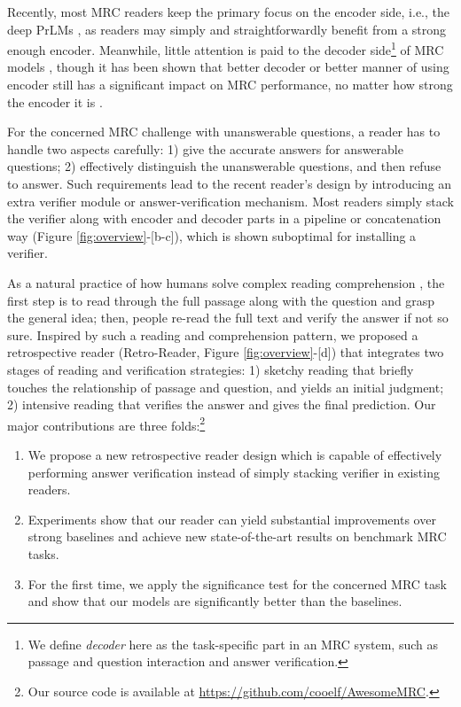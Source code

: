 \documentclass[letterpaper]{article} %
\begin{document}
Recently, most MRC readers keep the primary focus on the encoder side, i.e., the deep PrLMs \cite{devlin2018bert,yang2019xlnet,Lan2020ALBERT}, as readers may simply and straightforwardly benefit from a strong enough encoder. Meanwhile, little attention is paid to the decoder side\footnote{We define \textit{decoder} here as the task-specific part in an MRC system, such as passage and question interaction and answer verification.} of MRC models %
\cite{hu2019read,back2020neurquri,reddy2020answer}, though it has been shown that better decoder or better manner of using encoder still has a significant impact on MRC performance, no matter how strong the encoder it is \cite{dcmn20,liu2021filling,li2019dependency,li2018unified,zhu2020dual}.


For the concerned MRC challenge with unanswerable questions, a reader has to handle two aspects carefully: 1) give the accurate answers for answerable questions; 2) effectively distinguish the unanswerable questions, and then refuse to answer. Such requirements lead to the recent reader's design by introducing an extra verifier module or answer-verification mechanism. Most readers simply stack the verifier along with encoder and decoder parts in a pipeline or concatenation way (Figure \ref{fig:overview}-[b-c]), which is shown suboptimal for installing a verifier.

As a natural practice of how humans solve complex reading comprehension \cite{DBLP:conf/sigir/ZhengMLYZM19,doi:10.1080/00461520.1987.9653053}, the first step is to read through the full passage along with the question and grasp the general idea; then, people re-read the full text and verify the answer if not so sure. Inspired by such a reading and comprehension pattern, we proposed a retrospective reader (Retro-Reader, Figure \ref{fig:overview}-[d]) that integrates two stages of reading and verification strategies: 1) sketchy reading that briefly touches the relationship of passage and question, and yields an initial judgment; 2) intensive reading that verifies the answer and gives the final prediction. Our major contributions are three folds:\footnote{Our source code is available at \url{https://github.com/cooelf/AwesomeMRC}.}

\begin{enumerate}
	\item We propose a new retrospective reader design which is capable of effectively performing answer verification instead of simply stacking verifier in existing readers.
	\item Experiments show that our reader can yield substantial improvements over strong baselines and achieve new state-of-the-art results on benchmark MRC tasks.
	\item For the first time, we apply the significance test for the concerned MRC task and show that our models are significantly better than the baselines.
\end{enumerate}
\end{document}
